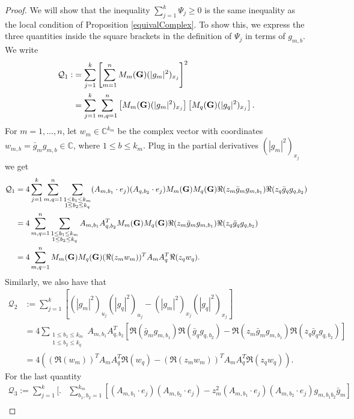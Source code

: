 \documentclass[9pt, a4paper]{amsart}
\newcommand{\1}{{\chi_{}}}%
\numberwithin{equation}{section}
\begin{document}
\begin{proof}
        We will show that the inequality $\sum_{j=1}^k \Psi_j\geq0$ is the same inequality as the local condition of Proposition \ref{equivalComplex}. To show this, we express the three quantities inside the square brackets in the definition of $\Psi_j$ in terms of $g_{m,b}$. We write
		\begin{align*}
			\mathcal{Q}_1:&=\sum_{j=1}^k\left[\sum_{m=1}^n M_{m}({\bf{G}})(|g_m|^2)_{x_j}\right]^2\\
			&=\sum_{j=1}^k\sum_{m, q=1}^{n}\left[M_{m}({\bf{G}})(|g_m|^2)_{x_j} \right] \left[M_{q}({\bf{G}})(|g_q|^2)_{x_j} \right].
		\end{align*}
	For $m = 1, \ldots, n$, let $w_m \in \mathbb{C}^{k_m}$ be the complex vector with coordinates $w_{m,b} = \bar{g}_m g_{m,b} \in \mathbb{C}$, where $1 \leq b \leq k_m$. Plug in the partial derivatives $(|g_m|^2)_{x_j}$ we get
	\begin{align*}
		\mathcal{Q}_1&=4\sum_{j=1}^k\sum_{m, q=1}^{n}\sum_{\substack{1\leq b_1\leq k_m \\ 1\leq b_2\leq k_q}} (A_{m,b_1}\cdot e_j) (A_{q,b_2}\cdot e_j)M_{m}({\bf{G}}) M_{q}({\bf{G}})\Re(z_m \bar{g}_m g_{m,b_1}) \Re(z_q \bar{g}_q g_{q,b_2})\\
		&=4\sum_{m, q=1}^{n}\sum_{\substack{1\leq b_1\leq k_m \\ 1\leq b_2\leq k_q}} A_{m,{b_1}} A_{q,{b_2}}^T M_{m}({\bf{G}}) M_{q}({\bf{G}})\Re(z_m \bar{g}_m g_{m,b_1}) \Re(z_q \bar{g}_q g_{q,b_2})\\
		&=4\sum_{m, q=1}^{n} M_{m}({\bf{G}})M_{q}({\bf{G}})  (\Re(z_mw_{m}))^T A_{m} A_{q}^T  \Re(z_qw_{q}).
	\end{align*}
		Similarly, we also have that
		\begin{align*}
			\mathcal{Q}_2&:=\sum_{j=1}^k\left[(|g_m|^2)_{u_j}(|g_q|^2)_{u_j}-(|g_m|^2)_{x_j}(|g_q|^2)_{x_j}\right]\\
			&=4 \sum_{\substack{1\leq b_1\leq k_m \\ 1\leq b_2\leq k_q}} A_{m,{b_1}} A_{q,{b_2}}^T \left[\Re(\bar{g}_m g_{m,b_1})  \Re(\bar{g}_q g_{q,b_2})  -  \Re(z_m \bar{g}_m g_{m,b_1})  \Re(z_q \bar{g}_q g_{q,b_2})  \right]\\
			&=4\left( (\Re(w_{m}))^TA_{m} A_{q}^T  \Re(w_{q})  -  (\Re(z_mw_{m}))^T A_{m} A_{q}^T  \Re(z_qw_{q}) \right) .
		\end{align*}
		For the last quantity
		\begin{align*}
		\mathcal{Q}_3:= \sum_{j=1}^k\Bigg[\Bigg.&\sum_{b_1, b_2=1}^{k_m}\left[(A_{m,b_1}\cdot e_j) (A_{m,b_2}\cdot e_j)-z_m^2(A_{m,b_1}\cdot e_j) (A_{m,b_2}\cdot e_j)g_{m,b_1b_2}\bar{g}_m\right]\\

\end{align*}
\end{proof}
\end{document}
